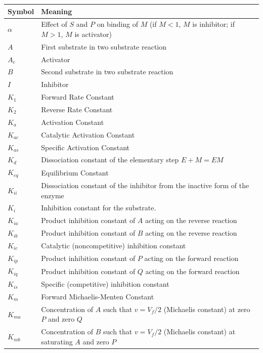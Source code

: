 \documentclass[10pt]{cekarticle}
\begin{document}
\renewcommand{\arraystretch}{1}
\begin{table}[ht]
  \begin{tabular}{lp{5.5in}}
    \toprule
    \textbf{Symbol} & \textbf{Meaning} \\
    \midrule
    $\alpha$	& Effect of $S$ and $P$ on binding of $M$ (if $M<1$, $M$ is inhibitor; if $M>1$, $M$ is activator) \\
    $A$		& First substrate in two substrate reaction \\
    $A_c$	& Activator \\
    $B$		& Second substrate in two substrate reaction \\
    $I$		& Inhibitor \\
    $K_1$	& Forward Rate Constant \\
    $K_2$	& Reverse Rate Constant \\
    $K_a$	& Activation Constant \\
    $K_{ac}$	& Catalytic Activation Constant \\
    $K_{as}$	& Specific Activation Constant \\
    $K_d$	& Dissociation constant of the elementary step $E + M = EM$ \\
    $K_{eq}$	& Equilibrium Constant \\
    $K_{ii}$	& Dissociation constant of the inhibitor from the inactive form of the enzyme \\
    $K_i$	& Inhibition constant for the substrate. \\
    $K_{ia}$	& Product inhibition constant of $A$ acting on the reverse reaction \\
    $K_{ib}$	& Product inhibition constant of $B$ acting on the reverse reaction \\
    $K_{ic}$	& Catalytic (noncompetitive) inhibition constant \\
    $K_{ip}$	& Product inhibition constant of $P$ acting on the forward reaction \\
    $K_{iq}$	& Product inhibition constant of $Q$ acting on the forward reaction \\
    $K_{is}$	& Specific (competitive) inhibition constant \\
    $K_m$	& Forward Michaelis-Menten Constant \\
    $K_{ma}$	& Concentration of $A$ such that $v = V_f/2$  (Michaelis constant) at zero $P$ and zero $Q$ \\
    $K_{mb}$	& Concentration of $B$ such that $v = V_f/2$  (Michaelis constant) at saturating $A$ and zero $P$ \\

\end{tabular}
\end{table}
\end{document}
